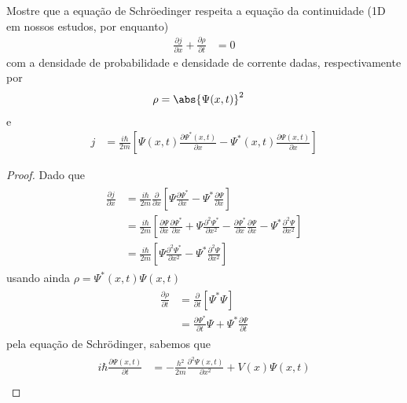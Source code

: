\begin{prob}
	Mostre que a equação de Schröedinger respeita a equação da continuidade (1D em nossos estudos, por enquanto)	
	\begin{align}
		\frac{\partial j}{\partial x}+\frac{\partial \rho}{\partial t} &= 0
	\end{align}
	com a densidade de probabilidade e  densidade de corrente dadas, respectivamente por
	\begin{align}
		\rho &= \abs{\Psi(x,t)}^{2}
	\end{align}
	e
	\begin{align}
		j &= \frac{i \hbar}{2m}\left[\Psi(x,t)\frac{\partial \Psi^{*}(x,t)}{\partial x}-\Psi^{*}(x,t)\frac{\partial \Psi(x,t)}{\partial x}\right]
	\end{align}
	\begin{proof}
		Dado que
		\begin{align}
			\begin{split}
				\frac{\partial j}{\partial x} &= \frac{i \hbar}{2m}\frac{\partial }{\partial x}\left[\Psi \frac{\partial \Psi^{*}}{\partial x}-\Psi^{*}\frac{\partial \Psi}{\partial x} \right]\\
																			&= \frac{i \hbar}{2m}\left[\frac{\partial \Psi}{\partial x}\frac{\partial \Psi^{*}}{\partial x}+\Psi\frac{\partial^{2} \Psi^{*}}{\partial x^{2}}-\frac{\partial \Psi^{*}}{\partial x}\frac{\partial \Psi}{\partial x}-\Psi^{*}\frac{\partial^{2} \Psi}{\partial x^{2}}\right]\\
																			&= \frac{i \hbar}{2m}\left[\Psi \frac{\partial^{2} \Psi^{*}}{\partial x^{2}}-\Psi^{*}\frac{\partial^{2} \Psi}{\partial x^{2}}\right]
			\end{split}
		\end{align}
		usando ainda $\rho=\Psi^{*}(x,t) \Psi(x,t)$
		\begin{align}
				\begin{split}
					\label{eq:p10-01}
					\frac{\partial \rho}{\partial t} &= \frac{\partial }{\partial t}\left[\Psi^{*} \Psi\right]\\
																					 &= \frac{\partial \Psi^{*}}{\partial t} \Psi+\Psi^{*}\frac{\partial \Psi}{\partial t}
				\end{split}
		\end{align}
		pela equação de Schrödinger, sabemos que
		\begin{align}
				\begin{split}
					i \hbar \frac{\partial \Psi(x,t)}{\partial t} &= -\frac{h^{2}}{2m}\frac{\partial^{2} \Psi(x,t)}{\partial x^{2}}+V(x) \Psi(x,t)\\

\end{split}
\end{align}
\end{proof}
\end{prob}
